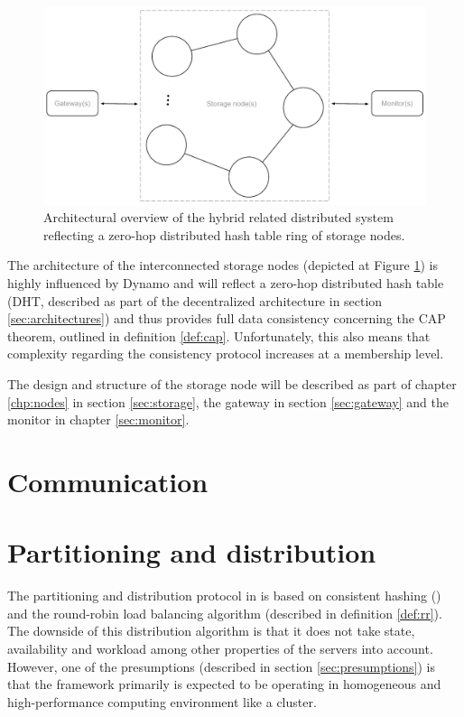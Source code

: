 \begin{figure}[h!]
	\centering
	\includegraphics[scale=0.7]{pdf/architecture-overview.pdf}
	\caption[Architectural overview]{Architectural overview of the hybrid related distributed system reflecting a zero-hop distributed hash table ring of storage nodes. \label{fig:architecture-overview}}
\end{figure}

The architecture of the interconnected storage nodes (depicted at Figure \ref{fig:architecture-overview}) is highly influenced by Dynamo and will reflect a zero-hop distributed hash table (DHT, described as part of the decentralized architecture in section \ref{sec:architectures}) and thus provides full data consistency concerning the CAP theorem, outlined in definition \ref{def:cap}. Unfortunately, this also means that complexity regarding the consistency protocol increases at a membership level.
\newline

The design and structure of the storage node will be described as part of chapter \ref{chp:nodes} in section \ref{sec:storage}, the gateway in section \ref{sec:gateway} and the monitor in chapter \ref{sec:monitor}.

\section{Communication} \label{sec:communication}

\section{Partitioning and distribution} \label{sec:pandd}
The partitioning and distribution protocol in \CodeName is based on consistent hashing () and the round-robin load balancing algorithm (described in definition \ref{def:rr}). The downside of this distribution algorithm is that it does not take state, availability and workload among other properties of the servers into account. However, one of the presumptions (described in section \ref{sec:presumptions}) is that the framework primarily is expected to be operating in homogeneous and high-performance computing environment like a cluster.
\vspace*{3mm}

